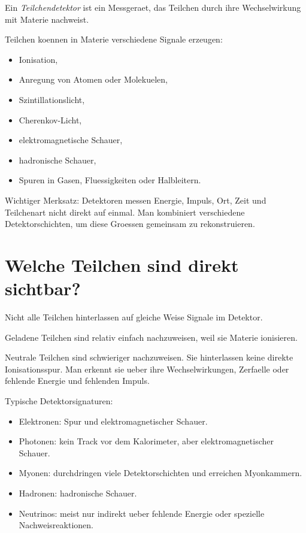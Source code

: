 \begin{definitionbox}
Ein \emph{Teilchendetektor} ist ein Messgeraet, das Teilchen durch ihre Wechselwirkung
mit Materie nachweist.
\end{definitionbox}

\begin{conceptbox}
Teilchen koennen in Materie verschiedene Signale erzeugen:
\begin{itemize}
    \item Ionisation,
    \item Anregung von Atomen oder Molekuelen,
    \item Szintillationslicht,
    \item Cherenkov-Licht,
    \item elektromagnetische Schauer,
    \item hadronische Schauer,
    \item Spuren in Gasen, Fluessigkeiten oder Halbleitern.
\end{itemize}
\end{conceptbox}

\begin{examtipbox}
Wichtiger Merksatz:
Detektoren messen Energie, Impuls, Ort, Zeit und Teilchenart nicht direkt auf einmal.
Man kombiniert verschiedene Detektorschichten, um diese Groessen gemeinsam zu rekonstruieren.
\end{examtipbox}

\section{Welche Teilchen sind direkt sichtbar?}

Nicht alle Teilchen hinterlassen auf gleiche Weise Signale im Detektor.

\begin{conceptbox}
Geladene Teilchen sind relativ einfach nachzuweisen, weil sie Materie ionisieren.

Neutrale Teilchen sind schwieriger nachzuweisen.
Sie hinterlassen keine direkte Ionisationsspur.
Man erkennt sie ueber ihre Wechselwirkungen, Zerfaelle oder fehlende Energie und
fehlenden Impuls.
\end{conceptbox}

\begin{notebox}
Typische Detektorsignaturen:
\begin{itemize}
    \item Elektronen: Spur und elektromagnetischer Schauer.
    \item Photonen: kein Track vor dem Kalorimeter, aber elektromagnetischer Schauer.
    \item Myonen: durchdringen viele Detektorschichten und erreichen Myonkammern.
    \item Hadronen: hadronische Schauer.
    \item Neutrinos: meist nur indirekt ueber fehlende Energie oder spezielle Nachweisreaktionen.
\end{itemize}
\end{notebox}

